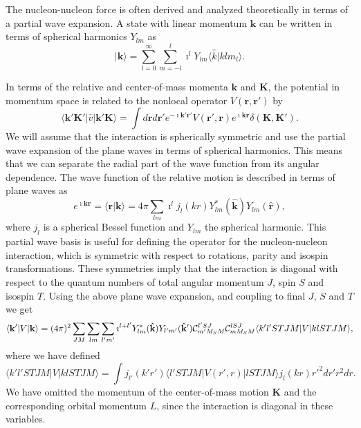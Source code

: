 \documentclass[thesis.tex]{subfiles}
\begin{document}
The nucleon-nucleon force is often derived and analyzed theoretically
in terms of a partial wave expansion. A state with linear momentum
$\mathbf{k}$ can be written in terms of spherical harmonics $Y_{lm}$ as
\[
\vert \mathbf{k} \rangle =
\sum_{l=0}^{\infty}\sum_{m=-l}^{l}\imath^lY_{lm}\langle\hat{k}\vert
klm_l\rangle.
\]

In terms of the relative and center-of-mass momenta $\mathbf{k}$ and
$\mathbf{K}$, the potential in momentum space is related to the
nonlocal operator $V(\mathbf{r},\mathbf{r}')$ by
\begin{equation*}
      \langle \mathbf{k'K'}\vert \hat{v} \vert \mathbf{k'K} \rangle=
      \int d\mathbf{r}d \mathbf{r'} e^{-\imath
        \mathbf{k'r'}}V(\mathbf{r'},\mathbf{r}) e^{\imath \mathbf{kr}}
      \delta(\mathbf{K},\mathbf{K'}).
\end{equation*}
We will assume that the interaction is spherically symmetric and use
the partial wave expansion of the plane waves in terms of spherical
harmonics.  This means that we can separate the radial part of the
wave function from its angular dependence. The wave function of the
relative motion is described in terms of plane waves as
\begin{equation*}
       e^{\imath \mathbf{kr}} = \langle\mathbf{r}\vert
       \mathbf{k}\rangle = 4\pi \sum_{lm} \imath ^{l} j_{l} (kr)
       Y_{lm}^{*}(\mathbf{\hat{k}}) Y_{lm}(\mathbf{\hat{r}}),
\end{equation*}
where $j_l$ is a spherical Bessel function and $Y_{lm}$ the spherical
harmonic.  This partial wave basis is useful for defining the operator
for the nucleon-nucleon interaction, which is symmetric with respect
to rotations, parity and isospin transformations. These symmetries
imply that the interaction is diagonal with respect to the quantum
numbers of total angular momentum $J$, spin $S$ and isospin $T$. Using
the above plane wave expansion, and coupling to final $J$, $S$ and $T$
we get
\begin{equation*}
      \langle \mathbf{k'}\vert V \vert \mathbf{k}\rangle = (4\pi)^2
      \sum_{JM}\sum_{lm}\sum_{l'm'} \imath ^{l+l'}
      Y_{lm}^{*}(\mathbf{\hat{k}}) Y_{l'm'}(\mathbf{\hat{k}'}) {\cal
        C}_{m'M_SM}^{l'SJ}{\cal C}_{mM_SM}^{lSJ} \langle k'l'STJM
      \vert V \vert klSTJM \rangle,
\end{equation*}
where we have defined
\begin{equation*}
    \langle k'l'STJM\vert V \vert klSTJM\rangle = \int
    j_{l'}(k'r')\langle l'STJM\vert V(r',r)\vert lSTJM \rangle j_l(kr)
    {r'}^2 dr' r^2 dr.
\end{equation*}
We have omitted the momentum of the center-of-mass motion $\mathbf{K}$
and the corresponding orbital momentum $L$, since the interaction is
diagonal in these variables. 
\end{document}
